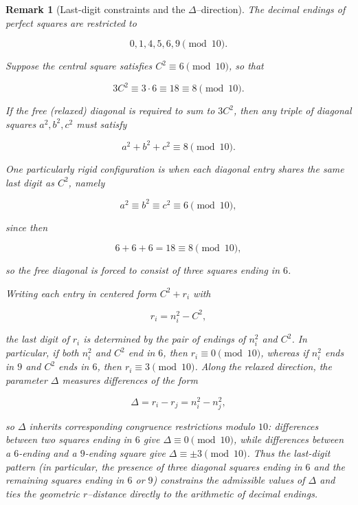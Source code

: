 \documentclass[12pt]{article}
\newtheorem{remark}{Remark}
\begin{document}
\begin{remark}[Last-digit constraints and the $\Delta$--direction]
The decimal endings of perfect squares are restricted to


\[
0,1,4,5,6,9 \pmod{10}.
\]


Suppose the central square satisfies $C^2 \equiv 6 \pmod{10}$, so that


\[
3C^2 \equiv 3\cdot 6 \equiv 18 \equiv 8 \pmod{10}.
\]


If the free (relaxed) diagonal is required to sum to $3C^2$, then any triple
of diagonal squares $a^2,b^2,c^2$ must satisfy


\[
a^2 + b^2 + c^2 \equiv 8 \pmod{10}.
\]


One particularly rigid configuration is when each diagonal entry shares the
same last digit as $C^2$, namely


\[
a^2 \equiv b^2 \equiv c^2 \equiv 6 \pmod{10},
\]


since then


\[
6+6+6 = 18 \equiv 8 \pmod{10},
\]


so the free diagonal is forced to consist of three squares ending in $6$.

Writing each entry in centered form $C^2 + r_i$ with


\[
r_i = n_i^2 - C^2,
\]


the last digit of $r_i$ is determined by the pair of endings of $n_i^2$ and
$C^2$.  In particular, if both $n_i^2$ and $C^2$ end in $6$, then
$r_i \equiv 0 \pmod{10}$, whereas if $n_i^2$ ends in $9$ and $C^2$ ends in
$6$, then $r_i \equiv 3 \pmod{10}$.  Along the relaxed direction, the
parameter $\Delta$ measures differences of the form


\[
\Delta = r_i - r_j = n_i^2 - n_j^2,
\]


so $\Delta$ inherits corresponding congruence restrictions modulo $10$:
differences between two squares ending in $6$ give $\Delta \equiv 0 \pmod{10}$,
while differences between a $6$-ending and a $9$-ending square give
$\Delta \equiv \pm 3 \pmod{10}$.  Thus the last-digit pattern (in particular,
the presence of three diagonal squares ending in $6$ and the remaining squares
ending in $6$ or $9$) constrains the admissible values of $\Delta$ and ties
the geometric $r$--distance directly to the arithmetic of decimal endings.
\end{remark}
\end{document}
